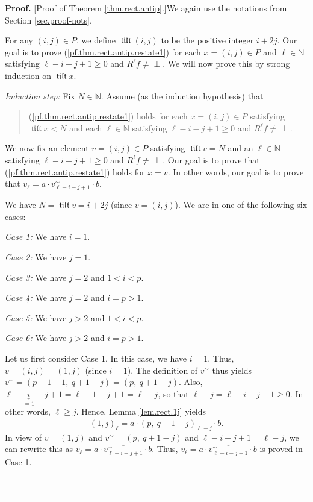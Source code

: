 \documentclass[numbers=enddot,12pt,final,onecolumn,notitlepage]{scrartcl}%
\theoremstyle{definition}
\newenvironment{vershort}{}{}
\newenvironment{statement}{\begin{quote}}{\end{quote}}
\newcommand{\undf}{\operatorname*{\bot}}
\DeclareMathOperator{\tilt}{\mathfrak{tilt}}
\newenvironment{proof}[1][Proof]{\noindent\textbf{#1.} }{\ \rule{0.5em}{0.5em}}
\begin{document}
\begin{vershort}


\begin{proof}
[Proof of Theorem \ref{thm.rect.antip}.]We again use the notations from
Section \ref{sec.proof-nots}.

For any $\left(  i,j\right)  \in P$, we define $\tilt \left(  i,j\right)  $ to
be the positive integer $i+2j$. Our goal is to prove
(\ref{pf.thm.rect.antip.restate1}) for each $x=\left(  i,j\right)  \in P$ and
$\ell\in\mathbb{N}$ satisfying $\ell-i-j+1\geq0$ and $R^{\ell}f\neq\undf$. We
will now prove this by strong induction on $\tilt x$.

\textit{Induction step:} Fix $N\in\mathbb{N}$. Assume (as the induction
hypothesis) that

\begin{statement}
(\ref{pf.thm.rect.antip.restate1}) holds for each $x=\left(  i,j\right)  \in
P$ satisfying $\tilt x<N$ and each $\ell\in\mathbb{N}$ satisfying
$\ell-i-j+1\geq0$ and $R^{\ell}f\neq\undf$.
\end{statement}

We now fix an element $v=\left(  i,j\right)  \in P$ satisfying $\tilt v=N$ and
an $\ell\in\mathbb{N}$ satisfying $\ell-i-j+1\geq0$ and $R^{\ell}f\neq\undf$.
Our goal is to prove that (\ref{pf.thm.rect.antip.restate1}) holds for $x=v$.
In other words, our goal is to prove that $v_{\ell}=a\cdot\overline
{v_{\ell-i-j+1}^{\sim}}\cdot b$. \medskip

We have $N=\tilt v=i+2j$ (since $v=\left(  i,j\right)  $). We are in one of
the following six cases:

\textit{Case 1:} We have $i=1$.

\textit{Case 2:} We have $j=1$.

\textit{Case 3:} We have $j=2$ and $1<i<p$.

\textit{Case 4:} We have $j=2$ and $i=p>1$.

\textit{Case 5:} We have $j>2$ and $1<i<p$.

\textit{Case 6:} We have $j>2$ and $i=p>1$. \medskip

Let us first consider Case 1. In this case, we have $i=1$. Thus, $v=\left(
i,j\right)  =\left(  1,j\right)  $ (since $i=1$). The definition of $v^{\sim}$
thus yields $v^{\sim}=\left(  p+1-1,\ q+1-j\right)  =\left(  p,\ q+1-j\right)
$. Also, $\ell-\underbrace{i}_{=1}-j+1=\ell-1-j+1=\ell-j$, so that
$\ell-j=\ell-i-j+1\geq0$. In other words, $\ell\geq j$. Hence, Lemma
\ref{lem.rect.1j} yields%
\[
\left(  1,j\right)  _{\ell}=a\cdot\overline{\left(  p,\ q+1-j\right)
_{\ell-j}}\cdot b.
\]
In view of $v=\left(  1,j\right)  $ and $v^{\sim}=\left(  p,\ q+1-j\right)  $
and $\ell-i-j+1=\ell-j$, we can rewrite this as $v_{\ell}=a\cdot
\overline{v_{\ell-i-j+1}^{\sim}}\cdot b$. Thus, $v_{\ell}=a\cdot
\overline{v_{\ell-i-j+1}^{\sim}}\cdot b$ is proved in Case 1. \medskip


\end{proof}
\end{vershort}
\end{document}
